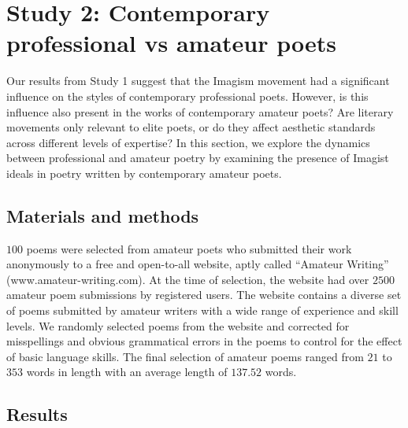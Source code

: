 \documentclass{book}
\begin{document}
\section{Study 2: Contemporary professional vs amateur poets}
Our results from Study 1 suggest that the Imagism movement had a significant influence on the styles of contemporary professional poets. However, is this influence also present in the works of contemporary amateur poets? Are literary movements only relevant to elite poets, or do they affect aesthetic standards across different levels of expertise? In this section, we explore the dynamics between professional and amateur poetry by examining the presence of Imagist ideals in poetry written by contemporary amateur poets. 

\subsection{Materials and methods}

$100$ poems were selected from amateur poets who submitted their work anonymously to a free and open-to-all website, aptly called ``Amateur Writing'' (www.amateur-writing.com). At the time of selection, the website had over $2500$ amateur poem submissions by registered users. The website contains a diverse set of poems submitted by amateur writers with a wide range of experience and skill levels. We randomly selected poems from the website and corrected for misspellings and obvious grammatical errors in the poems to control for the effect of basic language skills. The final selection of amateur poems ranged from $21$ to $353$ words in length with an average length of $137.52$ words. 


\subsection{Results}
\end{document}
